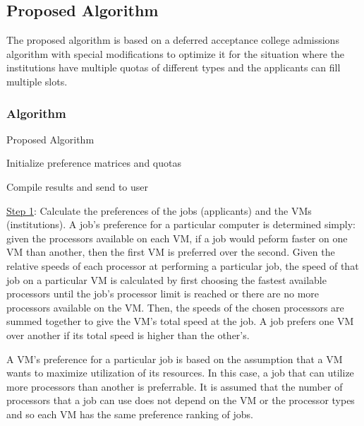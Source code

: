 \documentclass[conference]{IEEEtran}
\begin{document}
\subsection{Proposed Algorithm}
The proposed algorithm is based on a deferred acceptance
college admissions algorithm with special modifications to optimize it for 
the situation where the institutions have multiple quotas of different
types and the applicants can fill multiple slots.
\subsubsection{Algorithm}

\begin{algorithm}
\caption{Proposed Algorithm}\label{alg:PA}

Initialize preference matrices and quotas\;


Compile results and send to user\
\end{algorithm}
\underline{Step 1}: Calculate the preferences of the jobs (applicants) and the VMs
(institutions).
A job's preference for a particular computer is determined simply:
given the processors available on each VM, if a job would peform 
faster on one VM than another, then the first VM is preferred over the second. 
Given the relative speeds of each processor at performing a particular job,
the speed of that job on a particular VM is calculated by first choosing the fastest
available processors until the job's processor limit is reached or there are no more
processors available on the VM.
Then, the speeds of the chosen processors are summed together to give 
the VM's total speed at the job.
A job prefers one VM over another if its total speed
is higher than the other's. 

A VM's preference for a particular job is based on the assumption
that a VM wants to maximize utilization of its resources. 
In this case, a job that can utilize more processors than another
is preferrable. It is assumed that the number of processors that a job can use 
does not depend on the VM or the processor types and so each VM
has the same preference ranking of jobs.
\end{document}
